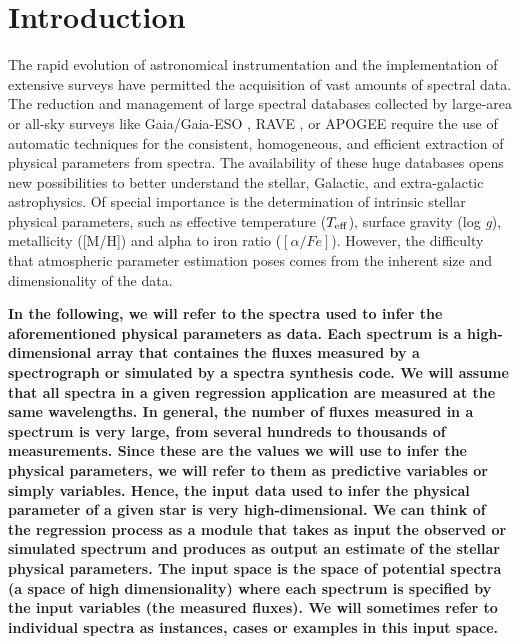 \documentclass[a4paper,fleqn,usenatbib]{mnras}
\begin{document}

\section{Introduction}

The rapid evolution of astronomical instrumentation and the
implementation of extensive surveys have permitted the acquisition of
vast amounts of spectral data.  The reduction and management of large
spectral databases collected by large-area or all-sky surveys like
Gaia/Gaia-ESO \citep{2006MNRAS.367..290J,2012Msngr.147...25G}, RAVE
\citep{2006AJ....132.1645S}, or APOGEE \citep{2011AJ....142...72E}
require the use of automatic techniques for the consistent,
homogeneous, and efficient extraction of physical parameters from
spectra. The availability of these huge databases opens new
possibilities to better understand the stellar, Galactic, and
extra-galactic astrophysics. Of special importance is the
determination of intrinsic stellar physical parameters, such as
effective temperature ($T_{\rm eff}$), surface gravity (log
\textit{g}), metallicity ([M/H]) and alpha to iron ratio 
($\left[ \alpha/Fe \right]$). However, the difficulty that
atmospheric parameter estimation poses comes from the inherent size
and dimensionality of the data. 

{\bf In the following, we will refer 
to the spectra used to infer the aforementioned physical parameters 
as data. Each spectrum is a high-dimensional array that 
containes the fluxes measured by a spectrograph or simulated by a 
spectra synthesis code. We will assume that all spectra in a given 
regression application are measured at the same wavelengths. In 
general, the number of fluxes measured in a spectrum is very large, 
from several hundreds to thousands of measurements. Since these are 
the values we will use to infer the physical parameters, we will 
refer to them as predictive variables or simply variables. Hence, the 
input data used to infer the physical parameter of a given star is very high-dimensional. 
We can think of the regression process as a module that takes as input the observed 
or simulated spectrum and produces as output an estimate of the 
stellar physical parameters. The input space is the space of potential 
spectra (a space of high dimensionality) where each spectrum is specified 
by the input variables (the measured fluxes). We will sometimes refer to 
individual spectra as instances, cases or examples in this input space.}
\end{document}
